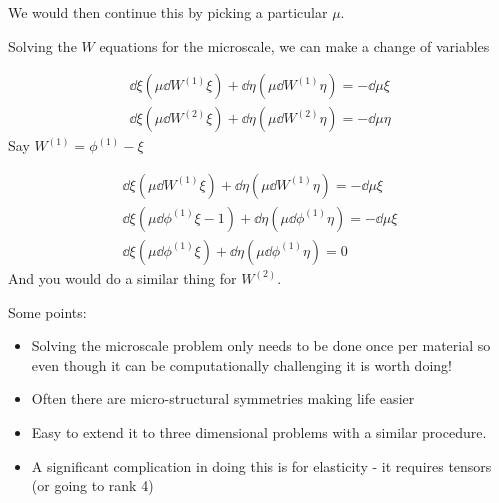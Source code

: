 \documentclass{X:/Documents/Coding/Latex/myassignment}
\begin{document}
We would then continue this by picking a particular $\mu$.


Solving the $W$ equations for the microscale, we can make a change of variables

\begin{align*}
    \dd{}{\xi} \left(\mu \dd{W^{(1)}}{\xi}\right) + \dd{}\eta \left(\mu \dd{W^{(1)}}{\eta}\right) = -\dd{\mu}{\xi}\\
    \dd{}{\xi} \left(\mu \dd{W^{(2)}}{\xi}\right) + \dd{}\eta \left(\mu \dd{W^{(2)}}{\eta}\right) = -\dd{\mu}{\eta}
\end{align*}
Say $W^{(1)} = \phi^{(1)} - \xi$

\begin{align*}
    \dd{}{\xi} \left(\mu \dd{W^{(1)}}{\xi}\right) + \dd{}\eta \left(\mu \dd{W^{(1)}}{\eta}\right) = -\dd{\mu}{\xi}\\
    \dd{}{\xi} \left(\mu \dd{\phi^{(1)}}{\xi} - 1\right) + \dd{}\eta \left(\mu \dd{\phi^{(1)}}{\eta}\right) = -\dd{\mu}{\xi}\\
    \dd{}{\xi} \left(\mu \dd{\phi^{(1)}}{\xi}\right) + \dd{}\eta \left(\mu \dd{\phi^{(1)}}{\eta}\right) = 0
\end{align*}
And you would do a similar thing for $W^{(2)}$.


Some points:
\begin{itemize}
    \item Solving the microscale problem only needs to be done once per material so even though it can be computationally challenging it is worth doing!
    \item Often there are micro-structural symmetries making life easier
    \item Easy to extend it to three dimensional problems with a similar procedure.
    \item A significant complication in doing this is for elasticity - it requires tensors (or going to rank 4)
\end{itemize}
\end{document}
